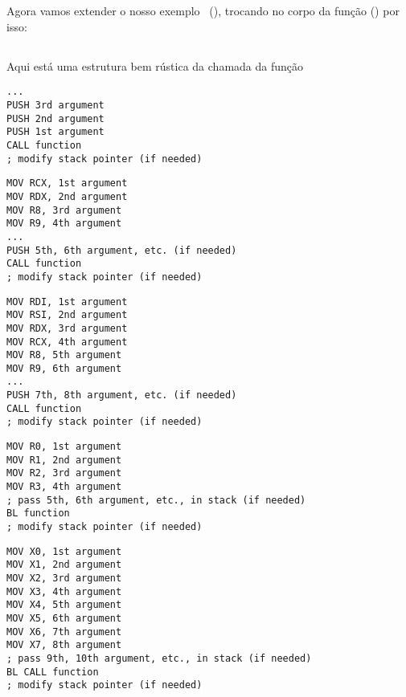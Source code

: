\section{\PrintfSeveralArgumentsSectionName}

Agora vamos extender o nosso exemplo \IT{\HelloWorldSectionName}~(),
trocando \printf no corpo da função \main() por isso:







\subsection{\Conclusion{}}

Aqui está uma estrutura bem rústica da chamada da função

\begin{lstlisting}[caption=x86,style=customasmx86]
...
PUSH 3rd argument
PUSH 2nd argument
PUSH 1st argument
CALL function
; modify stack pointer (if needed)
\end{lstlisting}

\begin{lstlisting}[caption=x64 (MSVC),style=customasmx86]
MOV RCX, 1st argument
MOV RDX, 2nd argument
MOV R8, 3rd argument
MOV R9, 4th argument
...
PUSH 5th, 6th argument, etc. (if needed)
CALL function
; modify stack pointer (if needed)
\end{lstlisting}

\begin{lstlisting}[caption=x64 (GCC),style=customasmx86]
MOV RDI, 1st argument
MOV RSI, 2nd argument
MOV RDX, 3rd argument
MOV RCX, 4th argument
MOV R8, 5th argument
MOV R9, 6th argument
...
PUSH 7th, 8th argument, etc. (if needed)
CALL function
; modify stack pointer (if needed)
\end{lstlisting}

\begin{lstlisting}[caption=ARM,style=customasmARM]
MOV R0, 1st argument
MOV R1, 2nd argument
MOV R2, 3rd argument
MOV R3, 4th argument
; pass 5th, 6th argument, etc., in stack (if needed)
BL function
; modify stack pointer (if needed)
\end{lstlisting}

\begin{lstlisting}[caption=ARM64,style=customasmARM]
MOV X0, 1st argument
MOV X1, 2nd argument
MOV X2, 3rd argument
MOV X3, 4th argument
MOV X4, 5th argument
MOV X5, 6th argument
MOV X6, 7th argument
MOV X7, 8th argument
; pass 9th, 10th argument, etc., in stack (if needed)
BL CALL function
; modify stack pointer (if needed)
\end{lstlisting}

